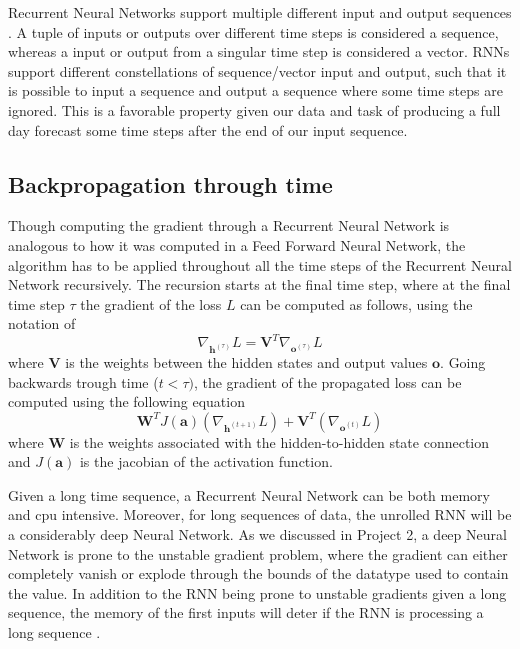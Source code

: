 \documentclass
[twocolumn,
secnumarabic,
nobibnotes,
aps,
prl,
reprint,
groupedaddress,
amsmath,
amssymb,
]{revtex4-2}
\begin{document}
Recurrent Neural Networks support multiple different input and output sequences \cite{Geron2019}. A tuple of inputs or outputs over different time steps is considered a sequence, whereas a input or output from a singular time step is considered a vector. RNNs support different constellations of sequence/vector input and output, such that it is possible to input a sequence and output a sequence where some time steps are ignored. This is a favorable property given our data and task of producing a full day forecast some time steps after the end of our input sequence.

\subsection{Backpropagation through time}
Though computing the gradient through a Recurrent Neural Network is analogous to how it was computed in a Feed Forward Neural Network, the algorithm has to be applied throughout all the time steps of the Recurrent Neural Network recursively. The recursion starts at the final time step, where at the final time step $\tau$ the gradient of the loss $L$ can be computed as follows, using the notation of \cite{Goodfellow2016}
\begin{equation}
  \nabla_{\bm{h}^{(\tau)}}L = \bm{V}^T \nabla_{\bm{o}^{(\tau)}}L
\end{equation}
where $\bm{V}$ is the weights between the hidden states and output values $\bm{o}$.
Going backwards trough time ($t < \tau)$, the gradient of the propagated loss can be computed using the following equation
\begin{equation}
  \bm{W}^TJ(\bm{a})(\nabla_{\bm{h}^{(t+1)}}L)+\bm{V}^T(\nabla_{\bm{o}^{(t)}}L)
\end{equation}
where $\bm{W}$ is the weights associated with the hidden-to-hidden state connection and $J(\bm{a})$ is the jacobian of the activation function.%


Given a long time sequence, a Recurrent Neural Network can be both memory and cpu intensive. Moreover, for long sequences of data, the unrolled RNN will be a considerably deep Neural Network. As we discussed in Project 2, a deep Neural Network is prone to the unstable gradient problem, where the gradient can either completely vanish or explode through the bounds of the datatype used to contain the value. In addition to the RNN being prone to unstable gradients given a long sequence, the memory of the first inputs will deter if the RNN is processing a long sequence \cite{Geron2019}.
\end{document}

